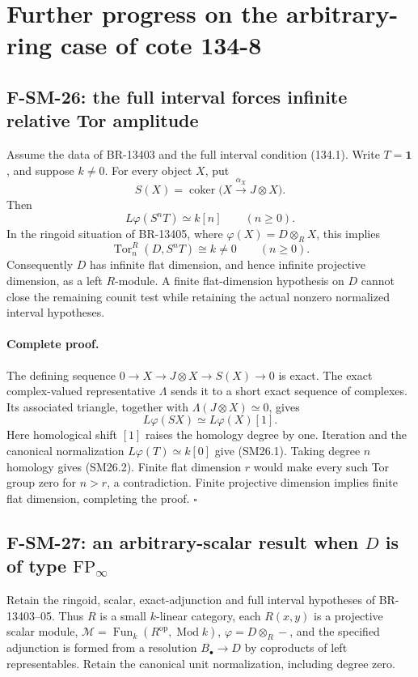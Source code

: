 \section{Further progress on the arbitrary-ring case of cote 134-8}

\subsection{F-SM-26: the full interval forces infinite relative Tor amplitude}
Assume the data of BR-13403 and the full interval condition (134.1).
Write \(T=\mathbf1\), and suppose \(k\ne0\).  For every object \(X\), put
\[
 S(X)=\operatorname{coker}\bigl(X\xrightarrow{\alpha_X}J\otimes X\bigr).
\]
Then
\[
 L\varphi(S^nT)\simeq k[n]\qquad(n\ge0).
 \tag{SM26.1}
\]
In the ringoid situation of BR-13405, where
\(\varphi(X)=D\otimes_R X\), this implies
\[
 \operatorname{Tor}^{R}_n(D,S^nT)\cong k\ne0
 \qquad(n\ge0).
 \tag{SM26.2}
\]
Consequently \(D\) has infinite flat dimension, and hence infinite
projective dimension, as a left \(R\)-module.  A finite flat-dimension
hypothesis on \(D\) cannot close the remaining counit test while retaining
the actual nonzero normalized interval hypotheses.

\paragraph{Complete proof.}
The defining sequence
\(0\to X\to J\otimes X\to S(X)\to0\) is exact.
The exact complex-valued representative \(\Lambda\) sends it to a short
exact sequence of complexes.  Its associated triangle, together with
\(\Lambda(J\otimes X)\simeq0\), gives
\[
 L\varphi(SX)\simeq L\varphi(X)[1].
\]
Here homological shift \([1]\) raises the homology degree by one.
Iteration and the canonical normalization \(L\varphi(T)\simeq k[0]\)
give (SM26.1).  Taking degree \(n\) homology gives (SM26.2).
Finite flat dimension \(r\) would make every such Tor group zero for
\(n>r\), a contradiction.  Finite projective dimension implies finite
flat dimension, completing the proof. \(\square\)

\subsection{F-SM-27: an arbitrary-scalar result when \(D\) is of type \(\mathrm{FP}_\infty\)}
Retain the ringoid, scalar, exact-adjunction and full interval hypotheses
of BR-13403--05.  Thus \(R\) is a small \(k\)-linear category, each
\(R(x,y)\) is a projective scalar module,
\(\mathcal M=\operatorname{Fun}_k(R^{\mathrm{op}},\operatorname{Mod}k)\),
\(\varphi=D\otimes_R-\), and the specified adjunction is formed from
a resolution \(B_\bullet\to D\) by coproducts of left representables.
Retain the canonical unit normalization, including degree zero.

